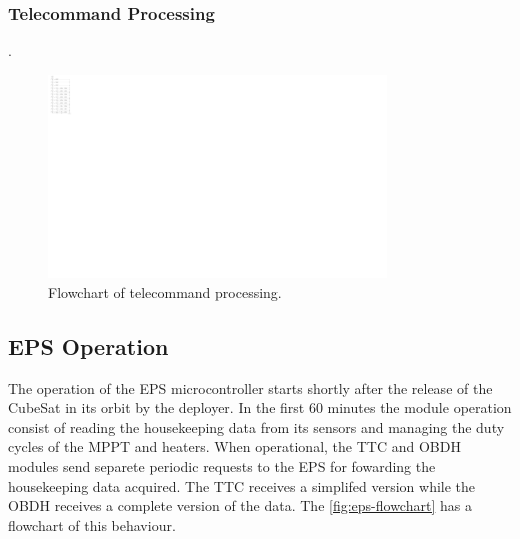 \subsubsection{Telecommand Processing}

.

\begin{figure}[!ht]
    \begin{center}
        \includegraphics[width=0.8\textwidth]{figures/tc-flowchart.pdf}
        \caption{Flowchart of telecommand processing.}
        \label{fig:tc-flowchart}
    \end{center}
\end{figure}

\subsection{EPS Operation}

The operation of the EPS microcontroller starts shortly after the release of the CubeSat in its orbit by the deployer.
In the first 60 minutes the module operation consist of reading the housekeeping data from its sensors and managing the duty cycles of the MPPT and heaters.
When operational, the TTC and OBDH modules send separete periodic requests to the EPS for fowarding the housekeeping data acquired.
The TTC receives a simplifed version while the OBDH receives a complete version of the data.
The \autoref{fig:eps-flowchart} has a flowchart of this behaviour.

